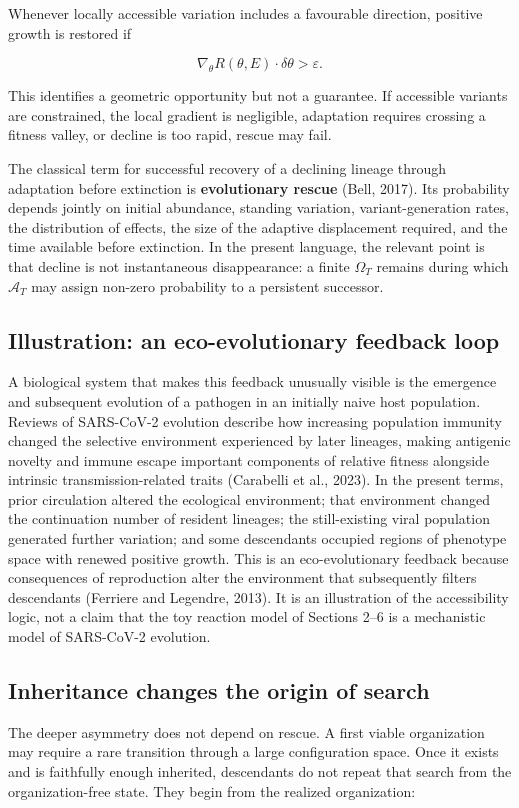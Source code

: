 \documentclass[11pt]{article}
\begin{document}
Whenever locally accessible variation includes a favourable direction,
positive growth is restored if

\[
\nabla_\theta R(\theta,E)\cdot\delta\theta>\varepsilon.
\tag{13}
\]

This identifies a geometric opportunity but not a guarantee. If
accessible variants are constrained, the local gradient is negligible,
adaptation requires crossing a fitness valley, or decline is too rapid,
rescue may fail.

The classical term for successful recovery of a declining lineage
through adaptation before extinction is \textbf{evolutionary rescue}
(Bell, 2017). Its probability depends jointly on initial abundance,
standing variation, variant-generation rates, the distribution of
effects, the size of the adaptive displacement required, and the time
available before extinction. In the present language, the relevant point
is that decline is not instantaneous disappearance: a finite
\(\Omega_T\) remains during which \(\mathcal A_T\) may assign non-zero
probability to a persistent successor.

\subsection{Illustration: an eco-evolutionary feedback
loop}
A biological system that makes this feedback unusually visible is the
emergence and subsequent evolution of a pathogen in an initially naive
host population. Reviews of SARS-CoV-2 evolution describe how increasing
population immunity changed the selective environment experienced by
later lineages, making antigenic novelty and immune escape important
components of relative fitness alongside intrinsic transmission-related
traits (Carabelli et al., 2023). In the present terms, prior circulation
altered the ecological environment; that environment changed the
continuation number of resident lineages; the still-existing viral
population generated further variation; and some descendants occupied
regions of phenotype space with renewed positive growth. This is an
eco-evolutionary feedback because consequences of reproduction alter the
environment that subsequently filters descendants (Ferriere and
Legendre, 2013). It is an illustration of the accessibility logic, not a
claim that the toy reaction model of Sections 2--6 is a mechanistic
model of SARS-CoV-2 evolution.

\subsection{Inheritance changes the origin of
search}
The deeper asymmetry does not depend on rescue. A first viable
organization may require a rare transition through a large configuration
space. Once it exists and is faithfully enough inherited, descendants do
not repeat that search from the organization-free state. They begin from
the realized organization:
\end{document}
